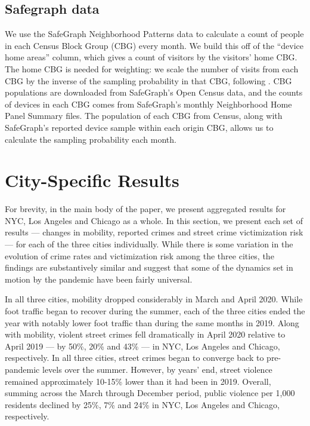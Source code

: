 \subsection{Safegraph data}
We use the SafeGraph Neighborhood Patterns data \citep{sg_neighb} to calculate a count of people in each Census Block Group (CBG) every month. We build this off of the ``device home areas'' column, which gives a count of visitors by the visitors' home CBG. The home CBG is needed for weighting: we scale the number of visits from each CBG by the inverse of the sampling probability in that CBG, following \citet{sg_scale}. CBG populations are downloaded from SafeGraph's Open Census data, and the counts of devices in each CBG comes from SafeGraph's monthly Neighborhood Home Panel Summary files. The population of each CBG from Census, along with SafeGraph's reported device sample within each origin CBG, allows us to calculate the sampling probability each month.


\clearpage
\newpage 
\section{City-Specific Results} \label{sec:appendix2}
For brevity, in the main body of the paper, we present aggregated results for NYC, Los Angeles and Chicago as a whole. In this section, we present each set of results --- changes in mobility, reported crimes and street crime victimization risk --- for each of the three cities individually. While there is some variation in the evolution of crime rates and victimization risk among the three cities, the findings are substantively similar and suggest that some of the dynamics set in motion by the pandemic have been fairly universal.

In all three cities, mobility dropped considerably in March and April 2020. While foot traffic began to recover during the summer, each of the three cities ended the year with notably lower foot traffic than during the same months in 2019. Along with mobility, violent street crimes fell dramatically in April 2020 relative to April 2019 --- by 50\%, 20\% and 43\% --- in NYC, Los Angeles and Chicago, respectively. In all three cities, street crimes began to converge back to pre-pandemic levels over the summer.  However, by years' end, street violence remained approximately 10-15\% lower than it had been in 2019. Overall, summing across the March through December period,  public violence per 1,000 residents declined by 25\%, 7\% and 24\% in NYC, Los Angeles and Chicago, respectively.

